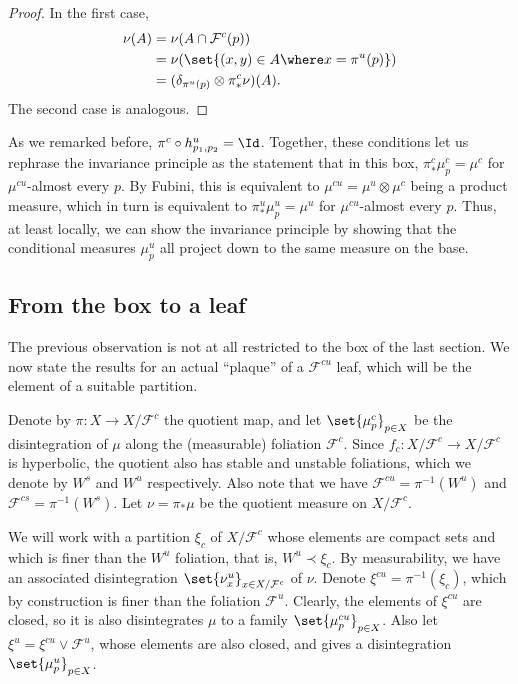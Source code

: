 \documentclass[../main]{subfiles}
\begin{document}
\begin{proof}
  In the first case,
  \begin{align*}
    \nu(A) &= \nu(A \cap \mathcal{F}^c(p))\\
    &= \nu(\set{(x,y) \in A \where x = \pi^u(p)})\\
    &= (\delta_{\pi^u(p)} \otimes \pi^c_*\nu)(A).
  \end{align*}
  The second case is analogous.
\end{proof}

As we remarked before, \(\pi^c \circ h^u_{p_1,p_2} = \Id\). Together, these conditions let us rephrase the invariance principle as the statement that in this box, \(\pi^c_*\mu^c_p = \mu^c\) for \(\mu^{cu}\)-almost every \(p\). By Fubini, this is equivalent to \(\mu^{cu} = \mu^u \otimes \mu^c\) being a product measure, which in turn is equivalent to \(\pi^u_*\mu^u_p = \mu^u\) for \(\mu^{cu}\)-almost every \(p\). Thus, at least locally, we can show the invariance principle by showing that the conditional measures \(\mu^u_p\) all project down to the same measure on the base. 

\subsection{From the box to a leaf}\label{sec:from-box-leaf}

The previous observation is not at all restricted to the box of the last section. We now state the results for an actual ``plaque'' of a \(\mathcal{F}^{cu}\) leaf, which will be the element of a suitable partition.

Denote by \(\pi \colon X \to X/\mathcal{F}^c\) the quotient map, and let \(\set{\mu^c_p}_{p \in X}\) be the disintegration of \(\mu\) along the (measurable) foliation \(\mathcal{F}^c\).
Since \(f_c \colon X/\mathcal{F}^c \to X/\mathcal{F}^c\) is hyperbolic, the quotient also has stable and unstable foliations, which we denote by \(W^s\) and \(W^u\) respectively. Also note that we have \(\mathcal{F}^{cu} = \pi ^{-1}(W^u)\) and \(\mathcal{F}^{cs} = \pi ^{-1}(W^s)\). Let \(\nu = \pi_*\mu\) be the quotient measure on \(X/\mathcal{F}^c\).

We will work with a partition \(\xi_c\) of \(X/\mathcal{F}^c\) whose elements are compact sets and which is finer than the \(W^u\) foliation, that is, \(W^u \prec \xi_c\). By measurability, we have an associated disintegration \(\set{\nu^u_x}_{x \in X/\mathcal{F}^c}\) of \(\nu\).
Denote \(\xi^{cu} = \pi ^{-1}(\xi_c)\), which by construction is finer than the foliation \(\mathcal{F}^u\). Clearly, the elements of \(\xi^{cu}\) are closed, so it is also disintegrates \(\mu\) to a family \(\set{\mu^{cu}_p}_{p \in X}\).
Also let \(\xi^u = \xi^{cu} \vee \mathcal{F}^u\), whose elements are also closed, and gives a disintegration \(\set{\mu^{u}_p}_{p \in X}\).
\end{document}
